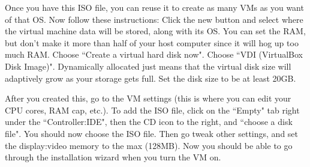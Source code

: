   Once you have this ISO file, you can reuse it to create as many VMs as you want of that OS. Now follow these instructions: Click the new button and select where the virtual machine data will be stored, along with its OS. You can set the RAM, but don't make it more than half of your host computer since it will hog up too much RAM. Choose ``Create a virtual hard disk now". Choose ``VDI (VirtualBox Disk Image)". Dynamically allocated just means that the virtual disk size will adaptively grow as your storage gets full. Set the disk size to be at least 20GB. 

  After you created this, go to the VM settings (this is where you can edit your CPU cores, RAM cap, etc.). To add the ISO file, click on the ``Empty" tab right under the ``Controller:IDE", then the CD icon to the right, and ``choose a disk file". You should now choose the ISO file. Then go tweak other settings, and set the display:video memory to the max (128MB). Now you should be able to go through the installation wizard when you turn the VM on. 
